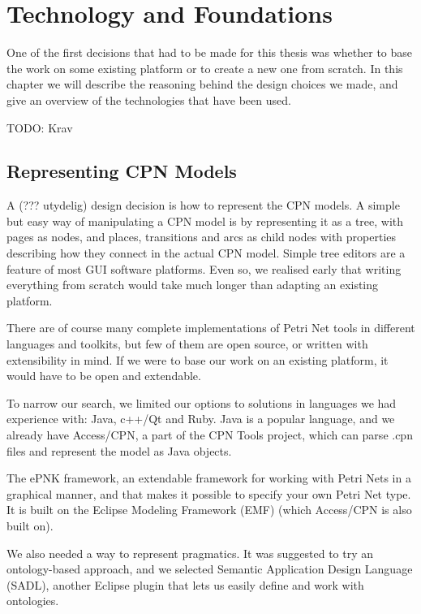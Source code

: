 \chapter{Technology and Foundations}
\label{chap:technology}

One of the first decisions that had to be made for this thesis was whether to
base the work on some existing platform or to create a new one from
scratch. In this chapter we will describe the reasoning behind the
design choices we made, and give an overview of the technologies that have been
used.

TODO: Krav

\section{Representing CPN Models}
	A (??? utydelig) design decision is how to represent the CPN models. A simple
	but easy way of manipulating a CPN model is by representing it as a tree, with pages as
	nodes, and places, transitions and arcs as child nodes with properties
	describing how they connect in the actual CPN model.
	Simple tree editors are a feature of most GUI software platforms.
	Even so, we realised early that writing everything from scratch would take
	much longer than adapting an existing platform.

	There are of course many complete implementations of Petri Net tools in
	different languages and toolkits, but few of them are open source, or written
	with extensibility in mind. If we were to base our work on an existing
	platform, it would have to be open and extendable. 
	
	To narrow our search, we limited our options to solutions in
	languages we had experience with: Java, c++/Qt and Ruby. Java is a popular
	language, and we already have Access/CPN, a part of the CPN Tools project,
	which can parse .cpn files and represent the model as Java objects. 
	
	The ePNK framework, an extendable framework for working with Petri Nets in a
	graphical manner, and that makes it possible to specify your own Petri Net
	type. It is built on the Eclipse Modeling Framework (EMF) (which Access/CPN is
	also built on).
	
	We also needed a way to represent pragmatics. It was suggested to try an
	ontology-based approach, and we selected Semantic Application Design Language
	(SADL), another Eclipse plugin that lets us easily define and work with ontologies.
	
	

